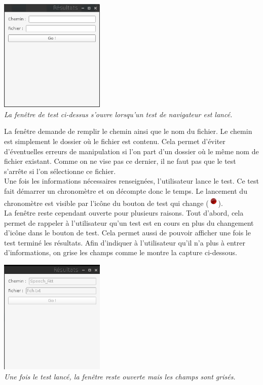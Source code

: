 \documentclass[a4paper, 11pt]{report}
\begin{document}
		\begin{center}
			\includegraphics[width=5cm]{test}\\
			\emph{La fenêtre de test ci-dessus s'ouvre lorsqu'un test de navigateur est lancé.\\}
		\end{center}
		
		La fenêtre demande de remplir le chemin ainsi que le nom du fichier. Le chemin est simplement le dossier où le fichier est contenu. Cela permet d'éviter d'éventuelles erreurs de manipulation si l'on part d'un dossier où le même nom de fichier existant. Comme on ne vise pas ce dernier, il ne faut pas que le test s'arrête si l'on sélectionne ce fichier.\\
		Une fois les informations nécessaires renseignées, l'utilisateur lance le test. Ce test fait démarrer un chronomètre et on décompte donc le temps. Le lancement du chronomètre est visible par l'icône du bouton de test qui change (\includegraphics[width=0.5cm]{stop}).\\
		La fenêtre reste cependant ouverte pour plusieurs raisons. Tout d'abord, cela permet de rappeler à l'utilisateur qu'un test est en cours en plus du changement d'icône dans le bouton de test. Cela permet aussi de pouvoir afficher une fois le test terminé les résultats. Afin d'indiquer à l'utilisateur qu'il n'a plus à entrer d'informations, on grise les champs comme le montre la capture ci-dessous.\\
		
		\begin{center}
			\includegraphics[width=5cm]{test_run}\\
			\emph{Une fois le test lancé, la fenêtre reste ouverte mais les champs sont grisés.\\}
		\end{center}
		
\end{document}
